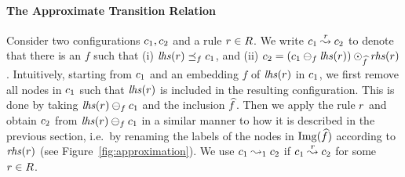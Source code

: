 \paragraph{\bf The Approximate Transition Relation}
%
Consider two configurations $c_1,c_2$ and a rule $r\in R$.
%
We write $c_1\stackrel{r}\leadsto c_2$ to denote that there is an $f$ such that 
%
(i) ${\it lhs}({r})\preceq_fc_1$, and 
%
(ii) $c_2=(c_1\ominus_f{\it lhs}({r}))
\odot_{\widehat{f}}{\it rhs}({r})$.
%
Intuitively, starting from $c_1$ and an embedding $f$ of ${\it lhs}({r})$ in $c_1$, we 
first remove all nodes in $c_1$ such that ${\it lhs}({r})$ is included in the resulting 
configuration.
%
This is done by taking ${\it lhs}({r})\ominus_fc_1$ and the inclusion $\widehat{f}$.
%
Then we apply the rule $r$ and obtain $c_2$ from ${\it lhs}({r})
\ominus_fc_1$ in a similar manner to how it is described in the previous section, i.e.\ by 
renaming the labels of the nodes in $\text{Img}({\widehat{f}})$ according to ${\it rhs}({r})$ 
(see Figure~\ref{fig:approximation}).
%
We use $c_1\stackrel{}\leadsto_1c_2$ if $c_1\stackrel{r}\leadsto c_2$ for some 
$r\in R$.
%

